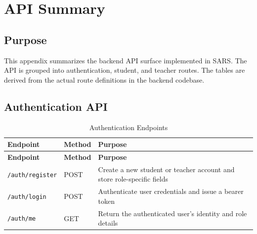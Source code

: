 \chapter{API Summary}

\section{Purpose}
This appendix summarizes the backend API surface implemented in SARS. The API is grouped into authentication, student, and teacher routes. The tables are derived from the actual route definitions in the backend codebase.

\section{Authentication API}
\begin{longtable}{p{}p{}p{}}
\caption{Authentication Endpoints}\\
\toprule
\textbf{Endpoint} & \textbf{Method} & \textbf{Purpose} \\
\midrule
\endfirsthead
\toprule
\textbf{Endpoint} & \textbf{Method} & \textbf{Purpose} \\
\midrule
\endhead
\texttt{/auth/register} & POST & Create a new student or teacher account and store role-specific fields \\
\texttt{/auth/login} & POST & Authenticate user credentials and issue a bearer token \\
\texttt{/auth/me} & GET & Return the authenticated user's identity and role details \\
\bottomrule
\end{longtable}

